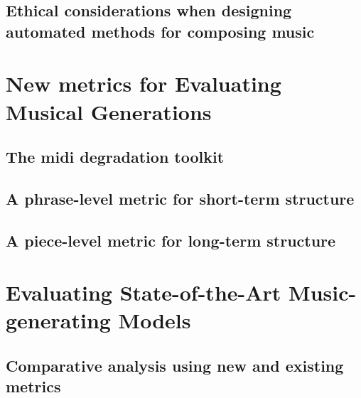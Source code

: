 \documentclass[12pt,a4paper,]{report}
\begin{document}
\hypertarget{ethical-considerations-when-designing-automated-methods-for-composing-music}{%
\section{Ethical considerations when designing automated methods for
composing
music}\label{ethical-considerations-when-designing-automated-methods-for-composing-music}}

\hypertarget{new-metrics-for-evaluating-musical-generations}{%
\chapter{New metrics for Evaluating Musical
Generations}\label{new-metrics-for-evaluating-musical-generations}}

\hypertarget{the-midi-degradation-toolkit}{%
\section{The midi degradation
toolkit}\label{the-midi-degradation-toolkit}}

\hypertarget{a-phrase-level-metric-for-short-term-structure}{%
\section{A phrase-level metric for short-term
structure}\label{a-phrase-level-metric-for-short-term-structure}}

\hypertarget{a-piece-level-metric-for-long-term-structure}{%
\section{A piece-level metric for long-term
structure}\label{a-piece-level-metric-for-long-term-structure}}

\hypertarget{evaluating-state-of-the-art-music-generating-models}{%
\chapter{Evaluating State-of-the-Art Music-generating
Models}\label{evaluating-state-of-the-art-music-generating-models}}

\hypertarget{comparative-analysis-using-new-and-existing-metrics}{%
\section{Comparative analysis using new and existing
metrics}\label{comparative-analysis-using-new-and-existing-metrics}}
\end{document}
